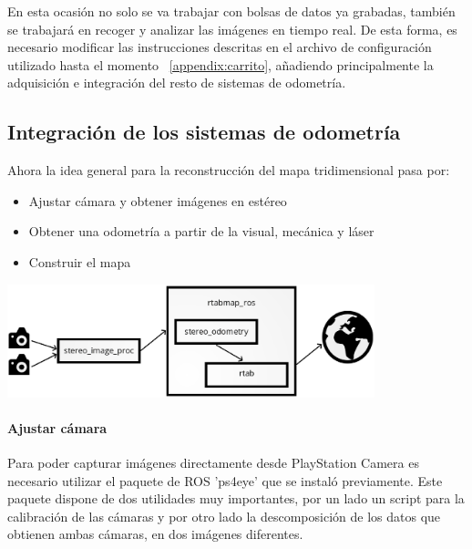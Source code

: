 En esta ocasión no solo se va trabajar con bolsas de datos ya grabadas, también
se trabajará en recoger y analizar las imágenes en tiempo real. De esta forma,
es necesario modificar las instrucciones descritas en el archivo de
configuración utilizado hasta el momento ~\ref{appendix:carrito}, añadiendo principalmente la adquisición e integración del resto de sistemas de odometría.

\subsection{Integración de los sistemas de odometría}

Ahora la idea general para la reconstrucción del mapa tridimensional pasa por:

\begin{itemize}
  \item Ajustar cámara y obtener imágenes en estéreo
  \item Obtener una odometría a partir de la visual, mecánica y láser
  \item Construir el mapa
\end{itemize}

\begin{minipage}{\linewidth}
    \centering
    \includegraphics[width=0.8\textwidth]{images/cap4/Carro-esquema.eps}
    \label{fig:Carro-esquema}
\end{minipage}

\paragraph{Ajustar cámara} \hspace{0pt}

Para poder capturar imágenes directamente desde PlayStation Camera es necesario
utilizar el paquete de ROS 'ps4eye' que se instaló previamente. Este paquete
dispone de dos utilidades muy importantes, por un lado un script para la
calibración de las cámaras y por otro lado la descomposición de los datos que
obtienen ambas cámaras, en dos imágenes diferentes.

